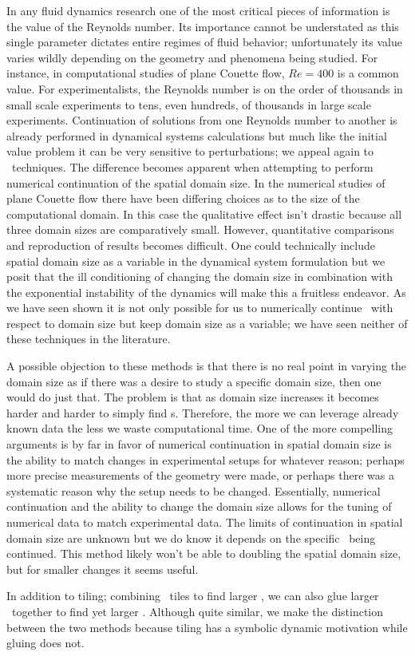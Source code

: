 In any fluid dynamics research one of the most critical
pieces of information is the value of the Reynolds number.
Its importance cannot be understated as this single parameter
dictates entire regimes of fluid behavior; unfortunately its value
varies wildly depending on the geometry and phenomena being studied.
For instance, in computational studies of plane Couette flow, $Re=400$
is a common value. For experimentalists,
the Reynolds number is on the order of thousands in small
scale experiments to tens, even hundreds, of thousands in large scale
experiments.
Continuation of solutions from one Reynolds number
to another is already performed in dynamical
systems calculations but much like the
initial value problem it can be very sensitive to perturbations;
we appeal again to \spt\ techniques. The difference becomes
apparent when attempting to perform numerical continuation of
the spatial domain size.
In the numerical studies of
plane Couette flow there have
been differing choices as to the size of the computational domain.
In this case the qualitative effect isn't drastic because all three
domain sizes are comparatively small. However, quantitative comparisons
and reproduction of results becomes difficult.
One could technically include spatial domain size as a variable in
the dynamical system formulation but we posit that the ill conditioning of
changing the domain size in combination with the exponential instability
of the dynamics will make this a fruitless endeavor.
As we have seen shown it is not only possible for us to
numerically continue \twots\ with respect to domain size but
keep domain size as a variable; we have seen neither of these
techniques in the literature.

A possible objection to these methods is that there is no
real point in varying the domain size as if there was
a desire to study a specific domain size, then one would do just that.
The problem is that as domain size increases it becomes harder
and harder to simply find {\po}s. Therefore, the more we can
leverage already known data the less we waste computational time.
One of the more compelling arguments is by far in favor
of numerical continuation in spatial domain size is the ability
to match changes in experimental setups for whatever reason;
perhaps more precise measurements of the geometry were made,
or perhaps there was a systematic reason why the
setup needs to be changed. Essentially, numerical continuation
and the ability to change the domain size allows for
the tuning of numerical data to match experimental data.
The limits of
continuation in spatial domain size are unknown but
we do know it depends on the specific \twot\ being continued.
This method likely won't be able to doubling the spatial domain size,
but for smaller changes it seems useful.

In addition to tiling; combining \spt\ tiles to find larger \twots,
we can also glue larger \twots\ together to find yet larger \twots.
Although quite similar, we make the distinction between the two
methods because tiling has a symbolic dynamic motivation while gluing
does not.
